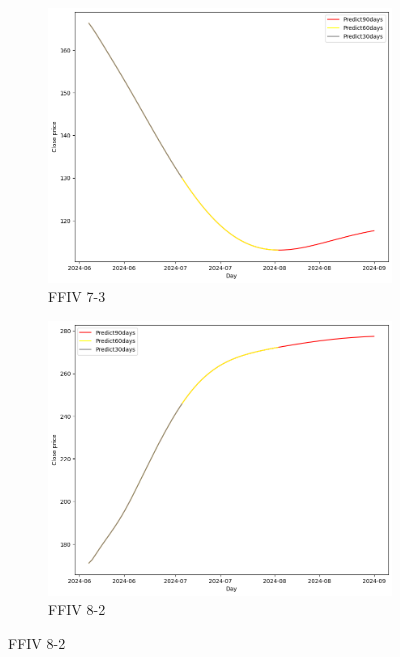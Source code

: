 \documentclass{ieeeojies}
\begin{document}
\begin{figure}[H]
    \centering
    \begin{subfigure}[b]{0.33\linewidth}
        \centering
        \includegraphics[width=\linewidth]{LSTM Plot/FFIV_LSTM_7_3-90.png}
        \caption{FFIV 7-3}
        \label{fig:ffiv-7-3}
    \end{subfigure}%
    \hfill
    \begin{subfigure}[b]{0.33\linewidth}
        \centering
        \includegraphics[width=\linewidth]{LSTM Plot/FFIV_LSTM_8_2-90.png}
        \caption{FFIV 8-2}
        \label{fig:ffiv-8-2}
    \end{subfigure}%

\end{figure}
\end{document}
